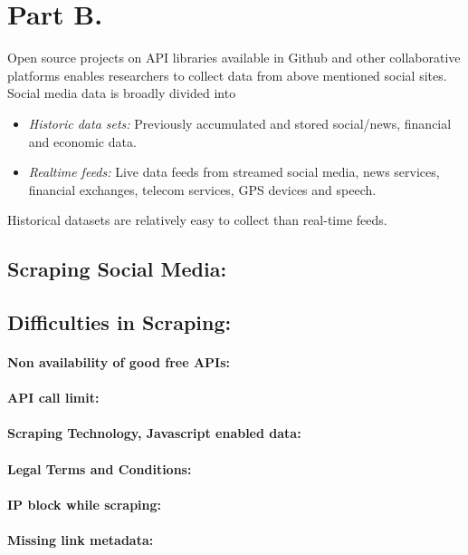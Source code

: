 \section{Part B.}
Open source projects on API libraries available in Github and other collaborative platforms enables researchers to collect data from above mentioned social sites. Social media data is broadly divided into
\begin{itemize}
  \item {\em Historic data sets:} Previously accumulated and stored social/news, financial and economic data.
  \item {\em Realtime feeds:} Live data feeds from streamed social media, news services, financial exchanges, telecom services, GPS devices and speech.
\end{itemize}

Historical datasets are relatively easy to collect than real-time feeds.

\subsection*{Scraping Social Media:}

\subsection*{Difficulties in Scraping:}
\paragraph{Non availability of good free APIs:}

\paragraph{API call limit:}


\paragraph{Scraping Technology, Javascript enabled data:}

\paragraph{Legal Terms and Conditions:}

\paragraph{IP block while scraping:}

\paragraph{Missing link metadata: }
